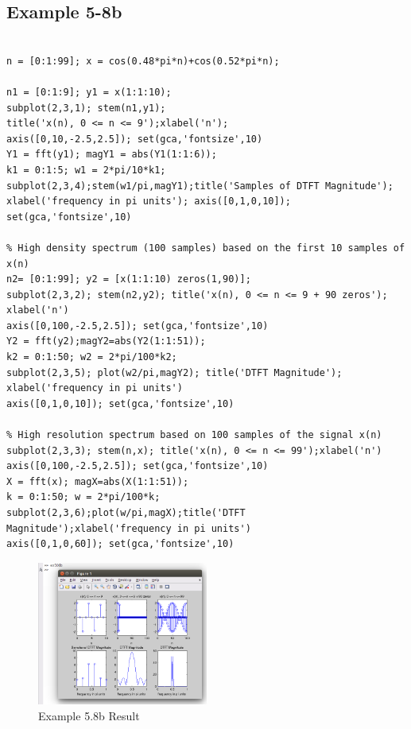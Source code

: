 \documentclass[11pt
  , a4paper
  , article
  , oneside
]{memoir}
\begin{document}
\clearpage

\subsection{Example 5-8b}
\begin{lstlisting}[style=termstyle]
% Example 5-8b

n = [0:1:99]; x = cos(0.48*pi*n)+cos(0.52*pi*n);

n1 = [0:1:9]; y1 = x(1:1:10);
subplot(2,3,1); stem(n1,y1);
title('x(n), 0 <= n <= 9');xlabel('n');
axis([0,10,-2.5,2.5]); set(gca,'fontsize',10)
Y1 = fft(y1); magY1 = abs(Y1(1:1:6));
k1 = 0:1:5; w1 = 2*pi/10*k1;
subplot(2,3,4);stem(w1/pi,magY1);title('Samples of DTFT Magnitude');
xlabel('frequency in pi units'); axis([0,1,0,10]); set(gca,'fontsize',10)

% High density spectrum (100 samples) based on the first 10 samples of x(n)
n2= [0:1:99]; y2 = [x(1:1:10) zeros(1,90)];
subplot(2,3,2); stem(n2,y2); title('x(n), 0 <= n <= 9 + 90 zeros'); xlabel('n')
axis([0,100,-2.5,2.5]); set(gca,'fontsize',10)
Y2 = fft(y2);magY2=abs(Y2(1:1:51));
k2 = 0:1:50; w2 = 2*pi/100*k2;
subplot(2,3,5); plot(w2/pi,magY2); title('DTFT Magnitude'); xlabel('frequency in pi units')
axis([0,1,0,10]); set(gca,'fontsize',10)

% High resolution spectrum based on 100 samples of the signal x(n)
subplot(2,3,3); stem(n,x); title('x(n), 0 <= n <= 99');xlabel('n')
axis([0,100,-2.5,2.5]); set(gca,'fontsize',10)
X = fft(x); magX=abs(X(1:1:51));
k = 0:1:50; w = 2*pi/100*k;
subplot(2,3,6);plot(w/pi,magX);title('DTFT Magnitude');xlabel('frequency in pi units')
axis([0,1,0,60]); set(gca,'fontsize',10)

\end{lstlisting}

\begin{figure}[h!]
	\centering
	\includegraphics[width=0.5\textwidth,height=0.4\textwidth]{./images/ex508c.png}
	\caption{Example 5.8b Result}
	\label{fig:Example 5.8b Result}
\end{figure}
\end{document}
